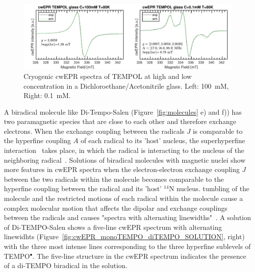 \begin{figure}[h]
\center
	\includegraphics[width=1\textwidth]{./operando_epr/figures/TEMPOL/cwEPR_TEMPOL_100mM_vs_p1mM_80K.pdf}
	\caption{Cryogenic cwEPR spectra of TEMPOL at high and low concentration in a Dichloroethane/Acetonitrile glass. Left: 100~mM, Right: 0.1~mM.}
	\label{fig:cwEPR_TEMPOL_High_Low_Concentrations}
\end{figure}



\par
A biradical molecule like Di-Tempo-Salen (Figure~\ref{fig:molecules} e) and f)) has two paramagnetic species that are close to each other and therefore exchange electrons. When the exchange coupling between the radicals $J$ is comparable to the hyperfine coupling $A$ of each radical to its 'host' nucleus, the superhyperfine interaction~\cite{} takes place, in which the radical is interacting to the nucleus of the neighboring radical~\cite{Eaton2018}. Solutions of biradical molecules with magnetic nuclei show more features in cwEPR spectra when the electron-electron exchange coupling $J$ between the two radicals within the molecule becomes comparable to the hyperfine coupling between the radical and its 'host' $^{14}$N nucleus. tumbling of the molecule and the restricted motions of each radical within the molecule cause a complex molecular motion that affects the dipolar and exchange couplings between the radicals and causes "spectra with alternating linewidths"~\cite{Eaton2018,Carrington_g_factor}. A solution of Di-TEMPO-Salen shows a five-line cwEPR spectrum with alternating linewidhts (Figure~\ref{fig:cwEPR_monoTEMPO_diTEMPO_SOLUTION}, right) with the three most intense lines corresponding to the three hyperfine sublevels of TEMPO$^{\bullet}$. The five-line structure in the cwEPR spectrum indicates the presence of a di-TEMPO biradical in the solution.




